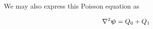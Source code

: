 %
%
%
%
%
%
%
%
%

\noindent We may also express this Poisson equation as

\begin{equation}
\label{eqn:poissonpsi2}
\nabla^2 \bm{\psi} = Q_0 + Q_1
\end{equation}

\where


